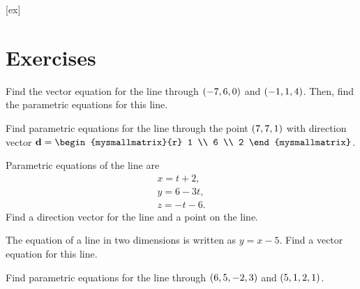 [ex]
\section*{Exercises}

\begin{enumialphparenastyle}

\begin{ex} 
  Find the vector equation for the line through $\left(-7,6,0\right)$ and
  $\left(-1,1,4\right)$. Then, find the parametric equations for this
  line.
\end{ex}

\begin{ex}
  Find parametric equations for the line through the point
  $\left(7,7,1\right)$ with direction vector
  $\vect{d} = \begin{mysmallmatrix}{r} 1 \\ 6 \\ 2 \end{mysmallmatrix}$.
\end{ex} 

\begin{ex}
  Parametric equations of the line are 
  \begin{equation*}
    \begin{array}{c}
      x = t+2, \\
      y = 6-3t, \\
      z = -t-6.
    \end{array}
  \end{equation*}
  Find a direction vector for the line and a point on the line.
\end{ex} 

\begin{ex}
  The equation of a line in two dimensions is written as $y=x-5$. Find
  a vector equation for this line.
\end{ex} 

\begin{ex}
  Find parametric equations for the line through $\left(6, 5, -2, 3\right)$
  and $\left(5, 1, 2, 1\right)$.
\end{ex} 


\end{enumialphparenastyle}
